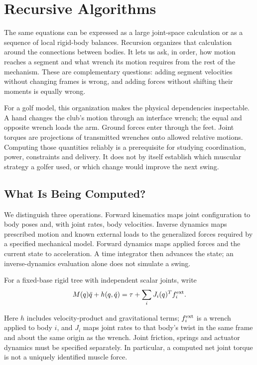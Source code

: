 \chapter{Recursive Algorithms}
\label{ch:recursive_algorithms}

The same equations can be expressed as a large joint-space calculation or as a sequence of local rigid-body balances. Recursion organizes that calculation around the connections between bodies. It lets us ask, in order, how motion reaches a segment and what wrench its motion requires from the rest of the mechanism. These are complementary questions: adding segment velocities without changing frames is wrong, and adding forces without shifting their moments is equally wrong.

For a golf model, this organization makes the physical dependencies inspectable. A hand changes the club's motion through an interface wrench; the equal and opposite wrench loads the arm. Ground forces enter through the feet. Joint torques are projections of transmitted wrenches onto allowed relative motions. Computing those quantities reliably is a prerequisite for studying coordination, power, constraints and delivery. It does not by itself establish which muscular strategy a golfer used, or which change would improve the next swing.

\section{What Is Being Computed?}
\label{sec:history_rnea}
\label{laymans:context_box}

We distinguish three operations. Forward kinematics maps joint configuration to body poses and, with joint rates, body velocities. Inverse dynamics maps prescribed motion and known external loads to the generalized forces required by a specified mechanical model. Forward dynamics maps applied forces and the current state to acceleration. A time integrator then advances the state; an inverse-dynamics evaluation alone does not simulate a swing.

For a fixed-base rigid tree with independent scalar joints, write
\begin{equation}
 M(q)\ddot q+h(q,\dot q)=\tau+\sum_i J_i(q)^T f_i^{\rm ext}.
 \label{eq:lagrange_matrix}
\end{equation}

Here $h$ includes velocity-product and gravitational terms; $f_i^{\rm ext}$ is a wrench applied to body $i$, and $J_i$ maps joint rates to that body's twist in the same frame and about the same origin as the wrench. Joint friction, springs and actuator dynamics must be specified separately. In particular, a computed net joint torque is not a uniquely identified muscle force.


